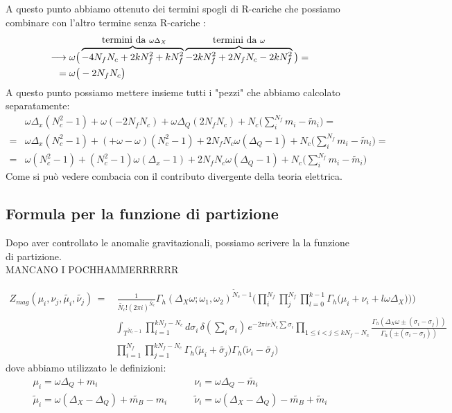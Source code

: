 \documentclass[a4paper,12pt]{article}
\begin{document}
A questo punto abbiamo ottenuto dei termini spogli di R-cariche che possiamo combinare con l'altro termine senza R-cariche :
\begin{align*}
	\longrightarrow & \; \omega \big (  \overbrace{- 4 N_f N_c  + 2 k N_f^2  +   k N_f^2}^{\hbox{ termini da } \omega \Delta_X}  \overbrace{- 2  k N_f^2 + 2 N_f N_c - 2  k N_f^2}^{\hbox{termini da } \omega} \big) = \\
	 = &\; \omega \big (  - 2 N_f N_c  \big) 
\end{align*}
A questo punto possiamo mettere insieme tutti i "pezzi" che abbiamo calcolato separatamente:
\begin{align*}
 & \omega \Delta_x ( N_c^2 - 1) + \omega ( - 2 N_f N_c  ) + \omega \Delta_Q ( 2 N_f N_c )  + N_c \big( \sum_i^{N_f} m_i - \tilde m_i  \big) =  \\
 = & \omega \Delta_x ( N_c^2 - 1) + ( + \omega - \omega)  ( N_c^2 -1 ) + 2 N_f N_c  \omega ( \Delta_Q -1 )  +  N_c \big( \sum_i^{N_f} m_i - \tilde m_i  \big) = \\
 = &\omega ( N_c^2 -1 ) + ( N_c^2 - 1) \omega (\Delta_x  - 1 ) + 2 N_f N_c  \omega ( \Delta_Q -1 )  + N_c \big( \sum_i^{N_f} m_i - \tilde m_i  \big) 
\end{align*}
Come si può vedere combacia con il contributo divergente della teoria elettrica.\\
\subsection{Formula per la funzione di partizione}
Dopo aver controllato le anomalie gravitazionali, possiamo scrivere la la funzione di partizione.\\
MANCANO I POCHHAMMERRRRRR

\begin{align*}
Z_{mag} ( \mu_i , \nu_j , \tilde{\mu_i}, \tilde{\nu_j} ) \,= & \, \frac{1}{\tilde{N_c}! (2 \pi i )^{\tilde{N_c}}}
 \Gamma_h ( \Delta_X \omega ; \omega_1 , \omega_2)^{ \tilde N_c-1}
\bigg( \prod_i^{N_f} \prod_j^{N_f}  \prod_{l=0}^{k-1} \Gamma_h \big( \mu_i+  \nu_i + l \omega \Delta_X) \big)  \bigg) \\
&\int_{T^{ \tilde N_c-1}}  
\prod_{i=1}^{ kN_f - N_c} d \sigma_i \, \delta( \sum_i \sigma_i) \, 
  e^{- 2 \pi i r \tilde N_c \sum \sigma_i} 
 \prod_{ 1 \leq i<j \leq kN_f - N_c} \frac{ \Gamma_h( \Delta_X \omega \pm (\sigma_i - \sigma_j)) }{ \Gamma_h ( \pm (\sigma_i - \sigma_j) )} \\
 &  \prod_{i=1}^{N_f} \prod_{j=1}^{k N_f - N_c} \Gamma_h \big( \tilde \mu_i + \tilde{\sigma_j} \big) \Gamma_h \big( \tilde \nu_i - \tilde{\sigma_j} \big)  
\end{align*}
dove abbiamo utilizzato le definizioni:
\begin{align*}
 \mu_i = \omega \Delta_Q + m_i  &\qquad \nu_i = \omega \Delta_Q - \tilde{m_i}\\
 \tilde \mu_i = \omega ( \Delta_X - \Delta_Q ) + \tilde{m_B} - m_i  &  \qquad \tilde \nu_i = \omega ( \Delta_X - \Delta_Q ) - \tilde{m_B} + \tilde m_i 
\end{align*}
\end{document}

